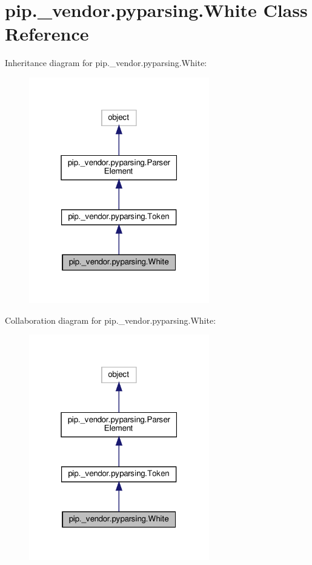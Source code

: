 \hypertarget{classpip_1_1__vendor_1_1pyparsing_1_1White}{}\section{pip.\+\_\+vendor.\+pyparsing.\+White Class Reference}
\label{classpip_1_1__vendor_1_1pyparsing_1_1White}


Inheritance diagram for pip.\+\_\+vendor.\+pyparsing.\+White\+:
\nopagebreak
\begin{figure}[H]
\begin{center}
\leavevmode
\includegraphics[width=223pt]{classpip_1_1__vendor_1_1pyparsing_1_1White__inherit__graph}
\end{center}
\end{figure}


Collaboration diagram for pip.\+\_\+vendor.\+pyparsing.\+White\+:
\nopagebreak
\begin{figure}[H]
\begin{center}
\leavevmode
\includegraphics[width=223pt]{classpip_1_1__vendor_1_1pyparsing_1_1White__coll__graph}
\end{center}
\end{figure}
